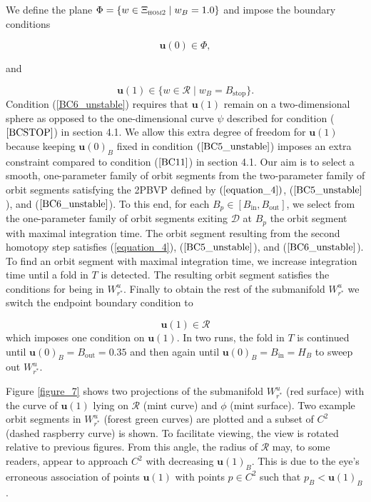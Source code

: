 \documentclass{ws-ijbc}
\begin{document}
We define the plane $\Phi = \{w \in \Xi_{\textsc{hom2}} \; | \;  w_B=1.0\}$ and impose the boundary conditions

\begin{equation}
\mathbf{u}(0) \in \Phi,
\label{BC5_unstable}
\end{equation}

\noindent
and 

\begin{equation}
\mathbf{u}(1) \in \{ w \in \mathscr{R} \; | \; w_B=B_{\mathrm{stop}}\}.
\label{BC6_unstable}
\end{equation}
\noindent
Condition (\ref{BC6_unstable}) requires that $\mathbf{u}(1)$ remain on a two-dimensional sphere as opposed to the one-dimensional curve $\psi$ described for condition ($\ref{BCSTOP}$) in section 4.1.  We allow this extra degree of freedom for $\mathbf{u}(1)$ because keeping $\mathbf{u}(0)_B$ fixed in condition $(\ref{BC5_unstable}$) imposes an extra constraint compared to condition ($\ref{BC11}$) in section 4.1.  Our aim is to select a smooth, one-parameter family of orbit segments from the two-parameter family of orbit segments satisfying the 2PBVP defined by $(\ref{equation_4})$, ($\ref{BC5_unstable}$), and ($\ref{BC6_unstable}$).  To this end, for each $B_p \in [B_{\mathrm{in}},B_{\mathrm{out}}]$, we select from the one-parameter family of orbit segments exiting $\mathscr{D}$ at $B_p$ the orbit segment with maximal integration time.  The orbit segment resulting from the second homotopy step satisfies (\ref{equation_4}), ($\ref{BC5_unstable}$), and ($\ref{BC6_unstable}$).  To find an orbit segment with maximal integration time, we increase integration time until a fold in $T$ is detected.  The resulting orbit segment satisfies the conditions for being in $W^u_{r^*}$.  Finally to obtain the rest of the submanifold $W^u_{r^*}$ we switch the endpoint boundary condition to

\begin{equation}
\mathbf{u}(1) \in \mathscr{R}
\label{BC7_unstable}
\end{equation}
\noindent
which imposes one condition on $\mathbf{u}(1)$.  In two runs, the fold in $T$ is continued until $\mathbf{u}(0)_B=B_{\mathrm{out}}=0.35$ and then again until $\mathbf{u}(0)_B=B_{\mathrm{in}}=H_B$ to sweep out $W^u_{r^*}$.

Figure \ref{figure_7} shows two projections of the submanifold $W^u_{r^*}$ (red surface) with the curve of $\mathbf{u}(1)$ lying on $\mathscr{R}$ (mint curve) and $\phi$ (mint surface).  Two example orbit segments in $W^u_{r^*}$ (forest green curves) are plotted and a subset of $C^2$ (dashed raspberry curve) is shown.  To facilitate viewing, the view is rotated relative to previous figures.  From this angle, the radius of $\mathscr{R}$ may, to some readers, appear to approach $C^2$ with decreasing $\mathbf{u}(1)_B$.  This is due to the eye's erroneous association of points $\mathbf{u}(1)$ with points $p \in C^2$ such that $p_B < \mathbf{u}(1)_B$.
\end{document}
